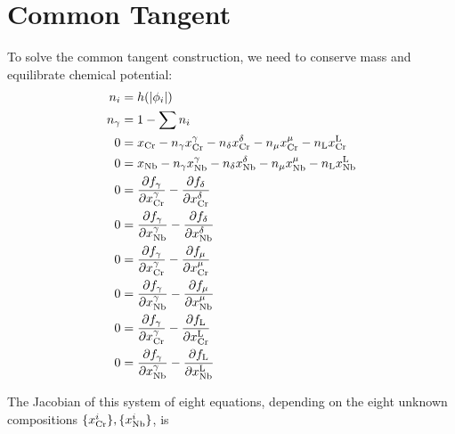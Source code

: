 \documentclass[10pt]{article}
\begin{document}
	\section{Common Tangent}
		To solve the common tangent construction, we need to conserve mass and equilibrate chemical potential:
		\begin{align}\nonumber
			n_i &= h(|\phi_i|)\\\nonumber
			n_{\gamma} &= 1 - \sum n_i\\
			0 &= x_{\ce{Cr}} - n_{\gamma}x_{\ce{Cr}}^{\gamma} - n_{\delta}x_{\ce{Cr}}^{\delta} - n_{\mu}x_{\ce{Cr}}^{\mu} - n_{\ce{L}}x_{\ce{Cr}}^{\ce{L}}\\
			0 &= x_{\ce{Nb}} - n_{\gamma}x_{\ce{Nb}}^{\gamma} - n_{\delta}x_{\ce{Nb}}^{\delta} - n_{\mu}x_{\ce{Nb}}^{\mu} - n_{\ce{L}}x_{\ce{Nb}}^{\ce{L}}\\
			0 &= \frac{\partial f_{\gamma}}{\partial x_{\ce{Cr}}^{\gamma}} - \frac{\partial f_{\delta}}{\partial x_{\ce{Cr}}^{\delta}}\\
			0 &= \frac{\partial f_{\gamma}}{\partial x_{\ce{Nb}}^{\gamma}} - \frac{\partial f_{\delta}}{\partial x_{\ce{Nb}}^{\delta}}\\
			0 &= \frac{\partial f_{\gamma}}{\partial x_{\ce{Cr}}^{\gamma}} - \frac{\partial f_{\mu}}{\partial x_{\ce{Cr}}^{\mu}}\\
			0 &= \frac{\partial f_{\gamma}}{\partial x_{\ce{Nb}}^{\gamma}} - \frac{\partial f_{\mu}}{\partial x_{\ce{Nb}}^{\mu}}\\
			0 &= \frac{\partial f_{\gamma}}{\partial x_{\ce{Cr}}^{\gamma}} - \frac{\partial f_{\ce{L}}}{\partial x_{\ce{Cr}}^{\ce{L}}}\\
			0 &= \frac{\partial f_{\gamma}}{\partial x_{\ce{Nb}}^{\gamma}} - \frac{\partial f_{\ce{L}}}{\partial x_{\ce{Nb}}^{\ce{L}}}
		\end{align}

		The Jacobian of this system of eight equations, depending on the eight unknown compositions $\{x_{\ce{Cr}}^i\}, \{x_{\ce{Nb}}^i\}$, is
		
\end{document}
